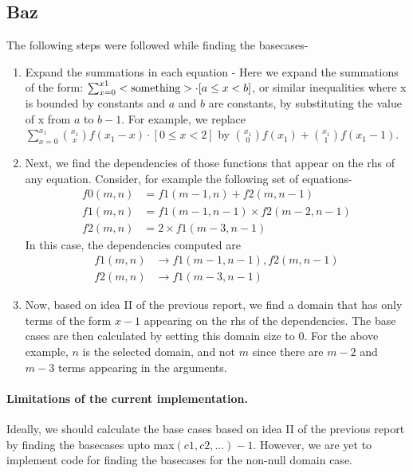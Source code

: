 \documentclass{article}
\begin{document}
\subsection{Baz}

The following steps were followed while finding the basecases-
\begin{enumerate}
  \item Expand the summations in each equation - Here we expand the summations
        of the form:
        $\sum_{x=0}^{x1}<\textnormal{something}> \cdot [a \le x < b]$, or
        similar inequalities where x is bounded by constants and $a$ and $b$ are
        constants, by substituting the value of x from $a$ to $b-1$. For
        example, we replace
        $\sum_{x=0}^{x_1} {{x_1}\choose{x}} f(x_1-x)\cdot[0 \le x < 2]$ by
        ${{x_1}\choose{0}}f(x_1) + {{x_1}\choose{1}}f(x_1-1)$.
  \item Next, we find the dependencies of those functions that appear on the rhs
        of any equation. Consider, for example the following set of equations-
        \begin{align}
          f0(m, n) &= f1(m-1, n) + f2(m, n-1)\\
          f1(m, n) &= f1(m-1, n-1) \times f2(m-2, n-1)\\
          f2(m, n) &= 2 \times f1(m-3, n-1)
        \end{align}
        In this case, the dependencies computed are
        \begin{align*}
          f1(m, n) &\rightarrow f1(m-1, n-1), f2(m, n-1)\\
          f2(m, n) &\rightarrow f1(m-3, n-1)
        \end{align*}
  \item Now, based on idea II of the previous report, we find a domain that has
        only terms of the form $x-1$ appearing on the rhs of the dependencies.
        The base cases are then calculated by setting this domain size to 0. For
        the above example, $n$ is the selected domain, and not $m$ since there
        are $m-2$ and $m-3$ terms appearing in the arguments.
\end{enumerate}

\paragraph{Limitations of the current implementation.} Ideally, we should
calculate the base cases based on idea II of the previous report by finding the
basecases upto max$(c1, c2, ...) - 1$. However, we are yet to implement code for
finding the basecases for the non-null domain case.



\end{document}

